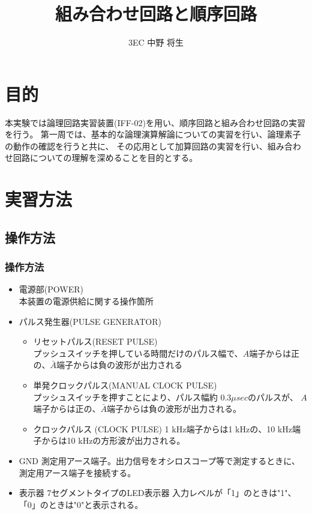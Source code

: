\documentclass[dvipdfmx]{jsarticle}
\begin{document}
	\title{組み合わせ回路と順序回路}
	\author{3EC 中野 将生}
	\maketitle
	\section{目的}
		本実験では論理回路実習装置(IFF-02)を用い、順序回路と組み合わせ回路の実習を行う。
		第一周では、基本的な論理演算解論についての実習を行い、論理素子の動作の確認を行うと共に、
		その応用として加算回路の実習を行い、組み合わせ回路についての理解を深めることを目的とする。
		\section{実習方法}
			\subsection{操作方法}
				\subsubsection{操作方法}
					\begin{itemize}
						\item 電源部(POWER) \\
							本装置の電源供給に関する操作箇所
						\item パルス発生器(PULSE GENERATOR)
							\begin{itemize}
								\item リセットパルス(RESET PULSE) \\
									プッシュスイッチを押している時間だけのパルス幅で、$A$端子からは正の、$\bar{A}$端子からは負の波形が出力される
								\item 単発クロックパルス(MANUAL CLOCK PULSE) \\
									プッシュスイッチを押すことにより、パルス幅約 $0.3 \mu sec$のパルスが、
									$A$端子からは正の、$\bar{A}$端子からは負の波形が出力される。
								\item クロックパルス (CLOCK PULSE)
									1 kHz端子からは1 kHzの、10 kHz端子からは10 kHzの方形波が出力される。
							\end{itemize}
						\item GND
							測定用アース端子。出力信号をオシロスコープ等で測定するときに、測定用アース端子を接続する。
						\item 表示器
							7セグメントタイプのLED表示器
							入力レベルが「1」のときは"1"、「0」のときは"0"と表示される。
					\end{itemize}
\end{document}
